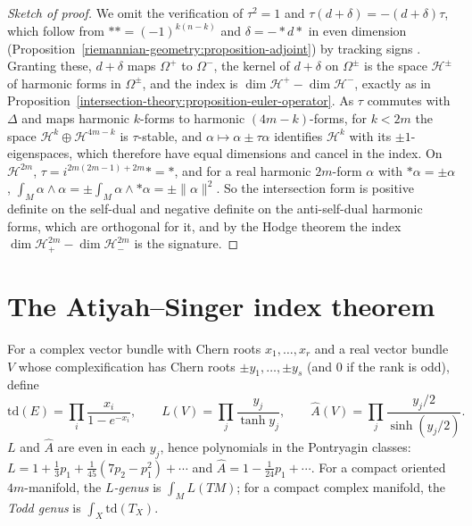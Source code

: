 \begin{proof}[Sketch of proof]
We omit the verification of $\tau^2 = 1$ and $\tau(d + \delta) = -(d + \delta)\tau$, which follow from $** = (-1)^{k(n-k)}$ and $\delta = -{*}d{*}$ in even dimension (Proposition~\ref{riemannian-geometry:proposition-adjoint}) by
tracking signs \cite[Chapter 3]{lawson-michelsohn}. Granting these, $d + \delta$ maps $\Omega^+$ to $\Omega^-$, the kernel of $d + \delta$ on $\Omega^\pm$ is the space $\mathcal{H}^\pm$ of harmonic forms in $\Omega^\pm$, and the index is
$\dim\mathcal{H}^+ - \dim\mathcal{H}^-$, exactly as in Proposition~\ref{intersection-theory:proposition-euler-operator}. As $\tau$ commutes with $\Delta$ and maps harmonic $k$-forms to harmonic $(4m - k)$-forms, for $k < 2m$ the space
$\mathcal{H}^k \oplus \mathcal{H}^{4m-k}$ is $\tau$-stable, and $\alpha \mapsto \alpha \pm \tau\alpha$ identifies $\mathcal{H}^k$ with its $\pm1$-eigenspaces, which therefore have equal dimensions and cancel in the index. On
$\mathcal{H}^{2m}$, $\tau = i^{2m(2m-1)+2m}{*} = *$, and for a real harmonic $2m$-form $\alpha$ with $*\alpha = \pm\alpha$, $\int_M\alpha \wedge \alpha = \pm\int_M\alpha \wedge *\alpha = \pm\|\alpha\|^2$. So the intersection form is positive definite on
the self-dual and negative definite on the anti-self-dual harmonic forms, which are orthogonal for it, and by the Hodge theorem the index $\dim\mathcal{H}^{2m}_+ - \dim\mathcal{H}^{2m}_-$ is the signature.
\end{proof}

\section{The Atiyah--Singer index theorem}\label{intersection-theory:section-atiyah-singer}

\begin{definition}\label{intersection-theory:definition-genera}
For a complex vector bundle with Chern roots $x_1, \ldots, x_r$ and a real vector bundle $V$ whose complexification has Chern roots $\pm y_1, \ldots, \pm y_s$ (and $0$ if the rank is odd), define
\[
\mathrm{td}(E) = \prod_i\frac{x_i}{1 - e^{-x_i}}, \qquad L(V) = \prod_j\frac{y_j}{\tanh y_j}, \qquad \hat A(V) = \prod_j\frac{y_j/2}{\sinh(y_j/2)}.
\]
$L$ and $\hat A$ are even in each $y_j$, hence polynomials in the Pontryagin classes: $L = 1 + \frac13p_1 + \frac{1}{45}(7p_2 - p_1^2) + \cdots$ and $\hat A = 1 - \frac{1}{24}p_1 + \cdots$. For a compact oriented $4m$-manifold, the
\emph{$L$-genus} is $\int_ML(TM)$; for a compact complex manifold, the \emph{Todd genus} is $\int_X\mathrm{td}(T_X)$.
\end{definition}

